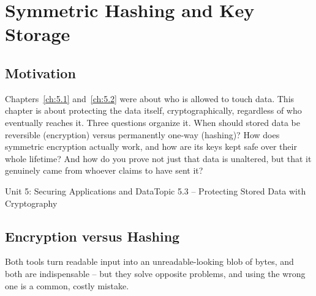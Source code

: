 \chapter{Symmetric Hashing and Key Storage}
\label{ch:5.3}


\section{Motivation}

Chapters~\ref{ch:5.1} and~\ref{ch:5.2} were about who is allowed to touch data. This chapter is
about protecting the data itself, cryptographically, regardless of who eventually reaches it. Three
questions organize it. When should stored data be reversible (encryption) versus permanently
one-way (hashing)? How does symmetric encryption actually work, and how are its keys kept safe over
their whole lifetime? And how do you prove not just that data is unaltered, but that it genuinely
came from whoever claims to have sent it?

\begin{apalignment}{Unit 5: Securing Applications and Data}{Topic 5.3 -- Protecting Stored Data with Cryptography}
\begin{apobjectives}
\end{apobjectives}
\end{apalignment}

\section{Encryption versus Hashing}

Both tools turn readable input into an unreadable-looking blob of bytes, and both are indispensable
-- but they solve opposite problems, and using the wrong one is a common, costly mistake.

